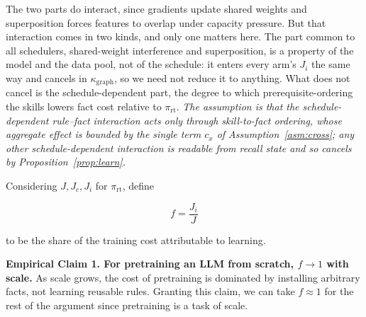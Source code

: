 \documentclass[11pt]{article}
\theoremstyle{plain}
\theoremstyle{definition}
\theoremstyle{remark}
\begin{document}
The two parts do interact, since gradients update shared weights and superposition forces features
to overlap under capacity pressure. But that interaction comes in two kinds, and only one matters
here. The part common to all schedulers, shared-weight interference and superposition, is a
property of the model and the data pool, not of the schedule: it enters every arm's $J_i$ the same
way and cancels in $\kappa_{\mathrm{graph}}$, so we need not reduce it to anything. What does not
cancel is the schedule-dependent part, the degree to which prerequisite-ordering the skills lowers
fact cost relative to $\pi_{\mathrm{rt}}$. \emph{The assumption is that the schedule-dependent
rule--fact interaction acts only through skill-to-fact ordering, whose aggregate effect is bounded
by the single term $c_x$ of Assumption~\ref{asm:cross}; any other schedule-dependent interaction is
readable from recall state and so cancels by Proposition~\ref{prop:learn}.}

Considering $J,J_c,J_i$ for $\pi_{\mathrm{rt}}$, define

\begin{equation*}
f=\frac{J_i}{J}
\end{equation*}

to be the share of the training cost attributable to learning.

\medskip

%
\textbf{Empirical Claim 1. For pretraining an LLM from scratch, $f \to 1$ with scale.}\label{prem:f} As scale grows, the cost of pretraining is dominated by installing arbitrary facts, not learning reusable rules. Granting this claim, we can take $f \approx 1$ for the rest of the argument since pretraining is a task of scale.
\end{document}
